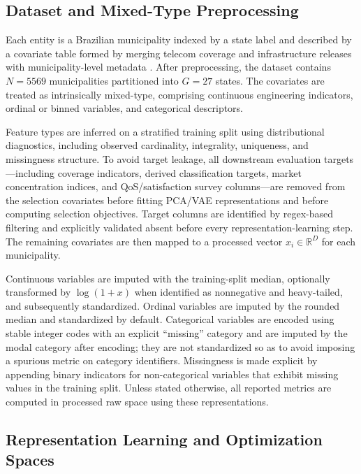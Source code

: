 \documentclass[10pt,journal]{IEEEtran}
\newcommand{\datasetN}{5569}              %
\newcommand{\1}{\mathbf{1}}
\theoremstyle{ieeethm}
\begin{document}
\subsection{Dataset and Mixed-Type Preprocessing}

Each entity is a Brazilian municipality indexed by a state label and described by a covariate table formed by merging telecom coverage and infrastructure releases with municipality-level metadata \cite{anatelEstacoesLicenciadasSMP,anatelCoberturaMovel,ibgeLocalidades,ibgePopEst2025}. After preprocessing, the dataset contains $N=\datasetN$ municipalities partitioned into $G=27$ states. The covariates are treated as intrinsically mixed-type, comprising continuous engineering indicators, ordinal or binned variables, and categorical descriptors.

Feature types are inferred on a stratified training split using distributional diagnostics, including observed cardinality, integrality, uniqueness, and missingness structure. To avoid target leakage, all downstream evaluation targets---including coverage indicators, derived classification targets, market concentration indices, and QoS/satisfaction survey columns---are removed from the selection covariates before fitting PCA/VAE representations and before computing selection objectives. Target columns are identified by regex-based filtering and explicitly validated absent before every representation-learning step. The remaining covariates are then mapped to a processed vector $x_i\in\mathbb{R}^D$ for each municipality.

Continuous variables are imputed with the training-split median, optionally transformed by $\log(1{+}x)$ when identified as nonnegative and heavy-tailed, and subsequently standardized. Ordinal variables are imputed by the rounded median and standardized by default. Categorical variables are encoded using stable integer codes with an explicit ``missing'' category and are imputed by the modal category after encoding; they are not standardized so as to avoid imposing a spurious metric on category identifiers. Missingness is made explicit by appending binary indicators for non-categorical variables that exhibit missing values in the training split. Unless stated otherwise, all reported metrics are computed in processed raw space using these representations.



\subsection{Representation Learning and Optimization Spaces}
\end{document}

